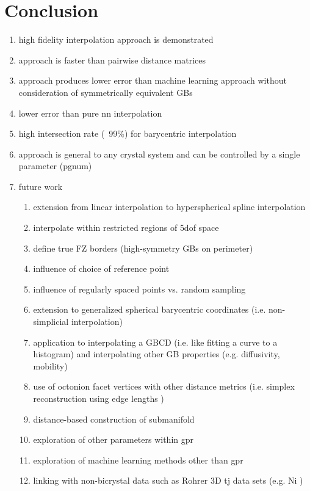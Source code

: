 \documentclass[preprint,12pt]{elsarticle}
\begin{document}
\section{Conclusion}

\begin{enumerate}
    \item high fidelity interpolation approach is demonstrated
    \item approach is faster than pairwise distance matrices
    \item approach produces lower error than machine learning approach without consideration of symmetrically equivalent GBs
    \item lower error than pure \gls{nn} interpolation
    \item high intersection rate (~99\%) for barycentric interpolation
    \item approach is general to any crystal system and can be controlled by a single parameter (pgnum)
    \item future work
    \begin{enumerate}
        \item extension from linear interpolation to hyperspherical spline interpolation \cite{Taijeron1994SplineHyperspheres}
        \item interpolate within restricted regions of \gls{5dof} space
        \item define true FZ borders (high-symmetry GBs on perimeter)
        \item influence of choice of reference point
        \item influence of regularly spaced points vs. random sampling
        \item extension to generalized spherical barycentric coordinates (i.e. non-simplicial interpolation) \cite{Langer2006SphericalCoordinates}
        \item application to interpolating a GBCD (i.e. like fitting a curve to a histogram) and interpolating other GB properties (e.g. diffusivity, mobility)
        \item use of octonion facet vertices with other distance metrics (i.e. simplex reconstruction using edge lengths \cite{Connor2017High-dimensionalSearch})
        \item distance-based construction of submanifold \cite{Boissonnat2017OnlySubmanifolds}
        \item exploration of other parameters within \gls{gpr}
        \item exploration of machine learning methods other than \gls{gpr}
        \item linking with non-bicrystal data such as Rohrer 3D \gls{tj} data sets (e.g. Ni \cite{Li2009RelativeNickel})
    \end{enumerate}
\end{enumerate}
\end{document}
